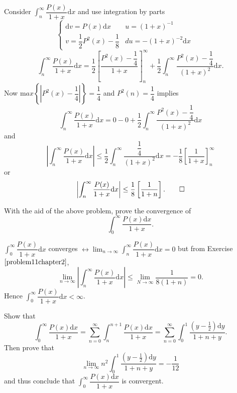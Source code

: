 \begin{solution}
Consider $\displaystyle\int_n^{\infty} \dfrac{P(x)}{1+x} \mathrm{d}x$ and use integration by parts 
$$\left\{ \begin{array}{llll}
\mathrm{d}v=P(x)\mathrm{d}x & u=(1+x)^{-1} &  \\
v=\dfrac{1}{2} P^2(x)-\dfrac{1}{8} & du=-(1+x)^{-2} \mathrm{d}x & &
\end{array} \right.$$
$$\displaystyle\int_n^{\infty} \dfrac{P(x)}{1+x} \mathrm{d}x = \dfrac{1}{2} \left[ \dfrac{P^2(x)-\dfrac{1}{4}}{1+x} \right]_n^{\infty} + \dfrac{1}{2} \displaystyle\int_n^{\infty} \dfrac{P^2(x)-\dfrac{1}{4}}{(1+x)^2} \mathrm{d}x.$$
Now ${\mathrm max} \left\{ \left|P^2(x)-\dfrac{1}{4} \right| \right\} = \dfrac{1}{4}$ and $P^2(n)=\dfrac{1}{4}$ implies
$$\displaystyle\int_n^{\infty} \dfrac{P(x)}{1+x} \mathrm{d}x = 0 - 0 + \dfrac{1}{2} \displaystyle\int_n^{\infty} \dfrac{P^2(x)-\dfrac{1}{4}}{(1+x)^2} \mathrm{d}x$$
and
$$\left| \displaystyle\int_n^{\infty} \dfrac{P(x)}{1+x} \mathrm{d}x\right| \leq \dfrac{1}{2} \displaystyle\int_n^{\infty} \dfrac{\dfrac{1}{4}}{(1+x)^2} \mathrm{d}x = -\dfrac{1}{8} \left[ \dfrac{1}{1+x} \right]_n^{\infty}$$
or
$$\left| \displaystyle\int_n^{\infty} \dfrac{P(x)}{1+x} \mathrm{d}x \right| \leq \dfrac{1}{8} \left[ \dfrac{1}{1+n} \right]. \qed$$
\end{solution}
\begin{problem}\label{problem12chapter2}
With the aid of the above problem, prove the convergence of 
$$\displaystyle\int_0^{\infty} \dfrac{P(x) \mathrm{d}x}{1+x}.$$
\end{problem}
\begin{solution}
$\displaystyle\int_0^{\infty} \dfrac{P(x)}{1+x} \mathrm{d}x$ converges $\longleftrightarrow \displaystyle\lim_{n \rightarrow \infty} \int_n^{\infty} \dfrac{P(x)}{1+x} \mathrm{d}x = 0$
but from Exercise $\ref{problem11chapter2}$,
$$\displaystyle\lim_{n \rightarrow \infty} \left| \displaystyle\int_n^{\infty} \dfrac{P(x)}{1+x} \mathrm{d}x \right| \leq \displaystyle\lim_{N \rightarrow \infty} \dfrac{1}{8(1+n)} = 0.$$
Hence $\displaystyle\int_0^{\infty} \dfrac{P(x)}{1+x} \mathrm{d}x < \infty$. 
\end{solution}
\begin{problem}\label{problem13chapter2}
Show that
$$\displaystyle\int_0^{\infty} \dfrac{P(x) \mathrm{d}x}{1+x} = \displaystyle\sum_{n=0}^{\infty} \displaystyle\int_n^{n+1} \dfrac{P(x) \mathrm{d}x}{1+x} = \displaystyle\sum_{n=0}^{\infty} \displaystyle\int_0^1 \dfrac{(y - \frac{1}{2}) \mathrm{d}y}{1+n+y}.$$
Then prove that
$$\displaystyle\lim_{n \rightarrow \infty} n^2 \displaystyle\int_0^1 \dfrac{(y-\frac{1}{2}) \mathrm{d}y}{1+n+y} = - \dfrac{1}{12}$$
and thus conclude that $\displaystyle\int_0^{\infty} \dfrac{P(x) \mathrm{d}x}{1+x}$ is convergent.
\end{problem}
